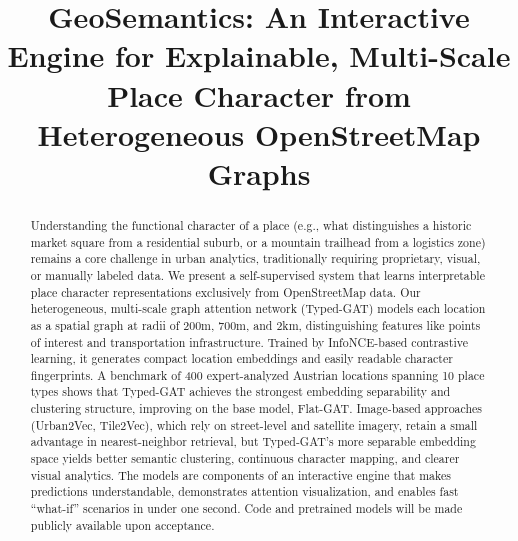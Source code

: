 \documentclass[]{interact}
\theoremstyle{plain}%
\theoremstyle{definition}
\theoremstyle{remark}
\begin{document}

\title{GeoSemantics: An Interactive Engine for Explainable, Multi-Scale Place Character from Heterogeneous OpenStreetMap Graphs}


\author{
}


\maketitle

\begin{abstract}
Understanding the functional character of a place (e.g., what distinguishes a historic market square from a residential suburb, or a mountain trailhead from a logistics zone) remains a core challenge in urban analytics, traditionally requiring proprietary, visual, or manually labeled data. We present a self-supervised system that learns interpretable place character representations exclusively from OpenStreetMap data. Our heterogeneous, multi-scale graph attention network (Typed-GAT) models each location as a spatial graph at radii of 200m, 700m, and 2km, distinguishing features like points of interest and transportation infrastructure. Trained by InfoNCE-based contrastive learning, it generates compact location embeddings and easily readable character fingerprints. A benchmark of 400 expert-analyzed Austrian locations spanning 10 place types shows that Typed-GAT achieves the strongest embedding separability and clustering structure, improving on the base model, Flat-GAT. Image-based approaches (Urban2Vec, Tile2Vec), which rely on street-level and satellite imagery, retain a small advantage in nearest-neighbor retrieval, but Typed-GAT's more separable embedding space yields better semantic clustering, continuous character mapping, and clearer visual analytics. The models are components of an interactive engine that makes predictions understandable, demonstrates attention visualization, and enables fast ``what-if'' scenarios in under one second. Code and pretrained models will be made publicly available upon acceptance.
\end{abstract}
\end{document}
